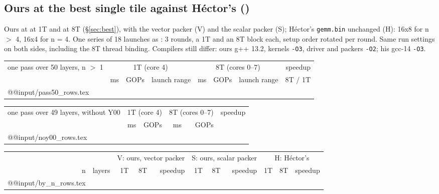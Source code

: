 \subsection{Ours at the best single tile against H\'ector's ()}\label{sec:109}
Ours at \Tone{} at 1T and \Teight{} at 8T (\S\ref{sec:best}), with the vector packer (V) and the scalar packer (S); H\'ector's \texttt{gemm.bin} unchanged (H): 16x8 for n $>$ 4, 16x4 for n = 4. One series of 18 launches as : 3 rounds, a 1T and an 8T block each, setup order rotated per round. Same run settings on both sides, including the 8T thread binding. Compilers still differ: ours g++ 13.2, kernels \texttt{-O3}, driver and packers \texttt{-O2}; his gcc-14 \texttt{-O3}.

\begin{center}\small
\begin{tabular}{@{}l rrc rrc r@{}}
\toprule
one pass over 50 layers, n $>$ 1 & \multicolumn{3}{c}{1T (core 4)} & \multicolumn{3}{c}{8T (cores 0--7)} & speedup \\
\cmidrule(lr){2-4}\cmidrule(lr){5-7}
 & ms & GOPs & launch range & ms & GOPs & launch range & 8T / 1T \\
\midrule
\csname @@input\endcsname \N/pass50_rows.tex
\bottomrule
\end{tabular}
\end{center}

\begin{center}\small
\begin{tabular}{@{}l rr rr r@{}}
\toprule
one pass over 49 layers, without Y00 & \multicolumn{2}{c}{1T (core 4)} & \multicolumn{2}{c}{8T (cores 0--7)} & speedup \\
 & ms & GOPs & ms & GOPs & \\
\midrule
\csname @@input\endcsname \N/noy00_rows.tex
\bottomrule
\end{tabular}
\end{center}

\begin{center}\small\setlength\tabcolsep{4pt}
\begin{tabular}{@{}rr rrr rrr rrr@{}}
\toprule
 & & \multicolumn{3}{c}{V: ours, vector packer} & \multicolumn{3}{c}{S: ours, scalar packer} & \multicolumn{3}{c}{H: H\'ector's} \\
\cmidrule(lr){3-5}\cmidrule(lr){6-8}\cmidrule(l){9-11}
n & layers & 1T & 8T & speedup & 1T & 8T & speedup & 1T & 8T & speedup \\
\midrule
\csname @@input\endcsname \V/by_n_rows.tex
\bottomrule
\end{tabular}
\end{center}

